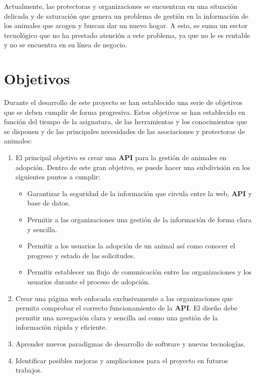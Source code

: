 Actualmente, las protectoras y organizaciones se encuentran en una situación delicada y de saturación que genera un problema de
gestión en la información de los animales que acogen y buscan dar un nuevo hogar. A esto, se suma un
sector tecnológico que no ha prestado atención a este problema, ya que no le es rentable y no se encuentra
en su línea de negocio. \\


\section{Objetivos}\label{sec:objetivos}

Durante el desarrollo de este proyecto se han establecido una serie de objetivos que se deben cumplir de forma
progresiva. Estos objetivos se han establecido en función del tiempo de la asignatura, de las herramientas y los
conocimientos que se disponen y de las principales necesidades de las asociaciones y protectoras de animales: \\

\begin{enumerate}
    \item El principal objetivo es crear una \textbf{API} para la gestión de animales en adopción. Dentro de este gran objetivo,
    se puede hacer una subdivisión en los siguientes puntos a cumplir:
    \begin{itemize}
        \item Garantizar la seguridad de la información que circula entre la web, \textbf{API} y base de datos.
        \item Permitir a las organizaciones una gestión de la información de forma clara y sencilla.
        \item Permitir a los usuarios la adopción de un animal así como conocer el progreso y estado de las solicitudes.
        \item Permitir establecer un flujo de comunicación entre las organizaciones y los usuarios durante el proceso de adopción.
    \end{itemize}
    \item Crear una página web enfocada exclusivamente a las organizaciones que permita comprobar el correcto funcionamiento de la \textbf{API}.
    El diseño debe permitir una navegación clara y sencilla así como una gestión de la información rápida y eficiente.
    \item Aprender nuevos paradigmas de desarrollo de software y nuevas tecnologías.
    \item Identificar posibles mejoras y ampliaciones para el proyecto en futuros trabajos.
\end{enumerate}


